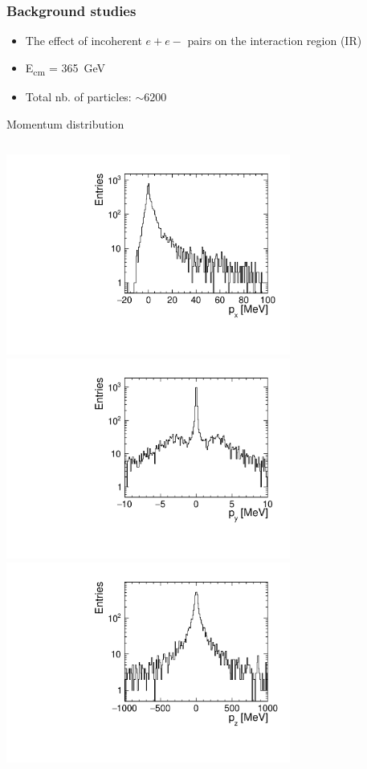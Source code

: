 \documentclass[hyperref={colorlinks=true,pdfpagelabels=false,linkcolor=black}, xcolor=dvipsnames,10pt]{beamer}
\begin{document}
\begin{frame}
	\frametitle{Background studies}

	\begin{itemize}
	\item The effect of incoherent $e+e-$ pairs on the interaction region (IR)
	\item E\textsubscript{cm} = 365~GeV
	\item Total nb. of particles: $\sim6200$
	\end{itemize}		
	
	\begin{block}{Momentum distribution}
	\begin{columns}
		\centering
		\includegraphics[width=0.7\textwidth]{../figures/incoherentPairs_px.pdf} \\									\includegraphics[width=0.7\textwidth]{../figures/incoherentPairs_py.pdf}
		\centering
		\includegraphics[width=0.7\textwidth]{../figures/incoherentPairs_pz.pdf}  \\

\end{columns}
\end{block}
\end{frame}
\end{document}
